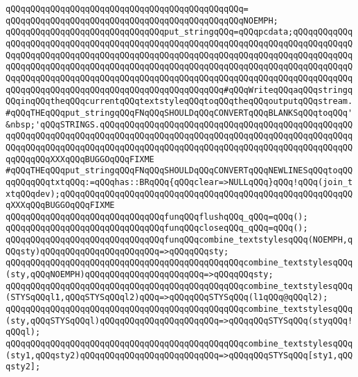\verb|qQQqqQQqqQQqqQQqqQQqqQQqqQQqqQQqqQQqqQQqqQQqqQQq=|\newline
\verb|qQQqqQQqqQQqqQQqqQQqqQQqqQQqqQQqqQQqqQQqqQQqqQQqNOEMPH;|\newline
\newline
\verb|qQQqqQQqqQQqqQQqqQQqqQQqqQQqqQQqput_stringqQQq=qQQqpcdata;qQQqqQQqqQQqqQQqqQQqqQQqqQQqqQQqqQQqqQQqqQQqqQQqqQQqqQQqqQQqqQQqqQQqqQQqqQQqqQQqqQQqqQQqqQQqqQQqqQQqqQQqqQQqqQQqqQQqqQQqqQQqqQQqqQQqqQQqqQQqqQQqqQQqqQQqqQQqqQQqqQQqqQQqqQQqqQQqqQQqqQQqqQQqqQQqqQQqqQQqqQQqqQQqqQQqqQQqqQQqqQQqqQQqqQQqqQQqqQQqqQQqqQQqqQQqqQQqqQQqqQQqqQQqqQQqqQQqqQQqqQQqqQQqqQQqqQQqqQQqqQQqqQQqqQQqqQQqqQQqqQQqqQQqqQQqqQQq#qQQqWriteqQQqaqQQqstringqQQqinqQQqtheqQQqcurrentqQQqtextstyleqQQqtoqQQqtheqQQqoutputqQQqstream.|\newline
\verb|#qQQqTHEqQQqput_stringqQQqFNqQQqSHOULDqQQqCONVERTqQQqBLANKSqQQqtoqQQq'&nbsp;'qQQqSTRINGS.qQQqqQQqqQQqqQQqqQQqqQQqqQQqqQQqqQQqqQQqqQQqqQQqqQQqqQQqqQQqqQQqqQQqqQQqqQQqqQQqqQQqqQQqqQQqqQQqqQQqqQQqqQQqqQQqqQQqqQQqqQQqqQQqqQQqqQQqqQQqqQQqqQQqqQQqqQQqqQQqqQQqqQQqqQQqqQQqqQQqqQQqqQQqqQQqqQQqqQQqXXXqQQqBUGGOqQQqFIXME|\newline
\verb|#qQQqTHEqQQqput_stringqQQqFNqQQqSHOULDqQQqCONVERTqQQqNEWLINESqQQqtoqQQqqQQqqQQqtxtqQQq:=qQQqhas::BRqQQq{qQQqclear=>NULLqQQq}qQQq!qQQq(join_txtqQQqdev);qQQqqQQqqQQqqQQqqQQqqQQqqQQqqQQqqQQqqQQqqQQqqQQqqQQqqQQqqQQqXXXqQQqBUGGOqQQqFIXME|\newline
\newline
\verb|qQQqqQQqqQQqqQQqqQQqqQQqqQQqqQQqfunqQQqflushqQQq_qQQq=qQQq();|\newline
\verb|qQQqqQQqqQQqqQQqqQQqqQQqqQQqqQQqfunqQQqcloseqQQq_qQQq=qQQq();|\newline
\newline
\verb|qQQqqQQqqQQqqQQqqQQqqQQqqQQqqQQqfunqQQqcombine_textstylesqQQq(NOEMPH,qQQqsty)qQQqqQQqqQQqqQQqqQQqqQQq=>qQQqqQQqsty;|\newline
\verb|qQQqqQQqqQQqqQQqqQQqqQQqqQQqqQQqqQQqqQQqqQQqqQQqcombine_textstylesqQQq(sty,qQQqNOEMPH)qQQqqQQqqQQqqQQqqQQqqQQq=>qQQqqQQqsty;|\newline
\verb|qQQqqQQqqQQqqQQqqQQqqQQqqQQqqQQqqQQqqQQqqQQqqQQqcombine_textstylesqQQq(STYSqQQql1,qQQqSTYSqQQql2)qQQq=>qQQqqQQqSTYSqQQq(l1qQQq@qQQql2);|\newline
\verb|qQQqqQQqqQQqqQQqqQQqqQQqqQQqqQQqqQQqqQQqqQQqqQQqcombine_textstylesqQQq(sty,qQQqSTYSqQQql)qQQqqQQqqQQqqQQqqQQqqQQq=>qQQqqQQqSTYSqQQq(styqQQq!qQQql);|\newline
\verb|qQQqqQQqqQQqqQQqqQQqqQQqqQQqqQQqqQQqqQQqqQQqqQQqcombine_textstylesqQQq(sty1,qQQqsty2)qQQqqQQqqQQqqQQqqQQqqQQqqQQq=>qQQqqQQqSTYSqQQq[sty1,qQQqsty2];|\newline
